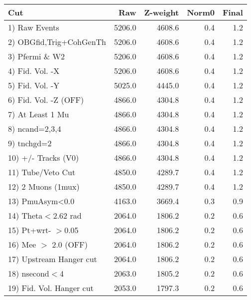  \begin{table}[h!]\centering
 \begin{tabular}{||l||r|r|r|r||}
 \hline
 \hline
 Cut & Raw & Z-weight & Norm0 & Final \\
 \hline
  1) Raw Events           &      5206.0 &      4608.6 &         0.4 &         1.2 \\
  2) OBGfid,Trig+CohGenTh &      5206.0 &      4608.6 &         0.4 &         1.2 \\
  3) Pfermi \& W2         &      5206.0 &      4608.6 &         0.4 &         1.2 \\
  4) Fid. Vol. -X         &      5206.0 &      4608.6 &         0.4 &         1.2 \\
  5) Fid. Vol. -Y         &      5025.0 &      4445.0 &         0.4 &         1.2 \\
  6) Fid. Vol. -Z (OFF)   &      4866.0 &      4304.8 &         0.4 &         1.2 \\
  7) At Least 1 Mu        &      4866.0 &      4304.8 &         0.4 &         1.2 \\
  8) ncand=2,3,4          &      4866.0 &      4304.8 &         0.4 &         1.2 \\
  9) tnchgd=2             &      4866.0 &      4304.8 &         0.4 &         1.2 \\
 10) +/- Tracks (V0)      &      4866.0 &      4304.8 &         0.4 &         1.2 \\
 11) Tube/Veto Cut        &      4850.0 &      4289.7 &         0.4 &         1.2 \\
 12) 2 Muons (1mux)       &      4850.0 &      4289.7 &         0.4 &         1.2 \\
 13) PmuAsym<0.0          &      4163.0 &      3669.4 &         0.3 &         0.9 \\
 14) Theta$<$2.62 rad     &      2064.0 &      1806.2 &         0.2 &         0.6 \\
 15) Pt+wrt- $>$0.05      &      2064.0 &      1806.2 &         0.2 &         0.6 \\
 16) Mee $>$ 2.0  (OFF)   &      2064.0 &      1806.2 &         0.2 &         0.6 \\
 17) Upstream Hanger cut  &      2064.0 &      1806.2 &         0.2 &         0.6 \\
 18) nsecond$<$4          &      2063.0 &      1805.2 &         0.2 &         0.6 \\
 19) Fid. Vol. Hanger cut &      2053.0 &      1797.3 &         0.2 &         0.6 \\

\end{tabular}
\end{table}
